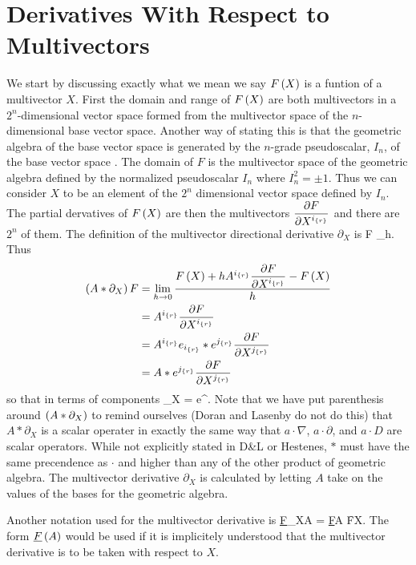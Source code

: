 \section{Derivatives With Respect to Multivectors}\label{MV_derivatives}
We start by discussing exactly what we mean we say ${F}\left ( {X} \right )$ is a funtion of a multivector $X$.  First the domain and range of ${F}\left ( {X} \right )$ are both 
multivectors in a $2^{n}$-dimensional vector space formed from the multivector space of the $n$-dimensional base vector space. Another way of stating this is
that the geometric algebra of the base vector space is generated by the $n$-grade pseudoscalar, $I_{n}$, of the base vector space .  The domain of $F$ is
the multivector space of the geometric algebra defined by the normalized pseudoscalar $I_{n}$ where $I_{n}^{2} = \pm 1$.  Thus we can
consider $X$ to be an element of the $2^{n}$ dimensional vector space defined by $I_{n}$. The partial dervatives of ${F}\left ( {X} \right )$ are then the multivectors
$\displaystyle\frac{\partial{F}}{\partial{X^{{i}_{\left \{{r}\right \}}}}}$ and there are $2^{n}$ of them. The definition of the multivector directional derivative $\partial_{X}$ is
\be
	F \equiv \lim_{h}.
\ee
Thus
\begin{align}
	\left ( {A*\partial_{X}} \right ) F &= \lim_{h\rightarrow 0}\displaystyle\frac{{F}\left ( {X} \right )+hA^{{i}_{\left \{{r}\right \}}}\displaystyle\frac{\partial{F}}{\partial{X^{{i}_{\left \{{r}\right \}}}}}-{F}\left ( {X} \right )}{h} \\
	                &= A^{{i}_{\left \{{r}\right \}}}\displaystyle\frac{\partial{F}}{\partial{X^{{i}_{\left \{{r}\right \}}}}} \\
	                &= A^{{i}_{\left \{{r}\right \}}}e_{{i}_{\left \{{r}\right \}}}*e^{{j}_{\left \{{r}\right \}}}\displaystyle\frac{\partial{F}}{\partial{X^{{j}_{\left \{{r}\right \}}}}} \\
	                &= A*e^{{j}_{\left \{{r}\right \}}}\displaystyle\frac{\partial{F}}{\partial{X^{{j}_{\left \{{r}\right \}}}}} 
\end{align}
so that in terms of components
\be
	\partial_{X} = e^{}.
\ee
Note that we have put parenthesis around $\left ( {A*\partial_{X}} \right )$ to remind ourselves (Doran and Lasenby do not do this) that $A*\partial_{X}$ is a scalar operater in
exactly the same way that $a\cdot\nabla$, $a\cdot\partial$, and $a\cdot D$ are scalar operators.  While not explicitly stated in D\&L or Hestenes, $*$ must have the
same precendence as $\cdot$ and higher than any of the other product of geometric algebra.  The multivector derivative $\partial_{X}$ is calculated by letting $A$ 
take on the values of the bases for the geometric algebra.

Another notation used for the multivector derivative is
\be
	\f{\underline{F}_{X}}{A} = \f{\underline{F}}{A} \equiv {}\f{F}{X}.
\ee
The form ${\underline{F}}\left ( {A} \right )$ would be used if it is implicitely understood that the multivector derivative is to be taken with respect to $X$.


